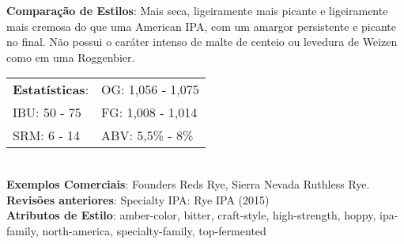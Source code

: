 \textbf{Comparação de Estilos}: Mais seca, ligeiramente mais picante e ligeiramente mais cremosa do que uma American IPA, com um amargor persistente e picante no final. Não possui o caráter intenso de malte de centeio ou levedura de Weizen como em uma Roggenbier. \\
\begin{tabular}{@{}p{35mm}p{35mm}@{}}
  \textbf{Estatísticas}: & OG: 1,056 - 1,075 \\
  IBU: 50 - 75  & FG: 1,008 - 1,014 \\
  SRM: 6 - 14  & ABV: 5,5\% - 8\%
\end{tabular}\\
\textbf{Exemplos Comerciais}: Founders Reds Rye, Sierra Nevada Ruthless Rye. \\
\textbf{Revisões anteriores}: Specialty IPA: Rye IPA (2015) \\
\textbf{Atributos de Estilo}: amber-color, bitter, craft-style, high-strength, hoppy, ipa-family, north-america, specialty-family, top-fermented
